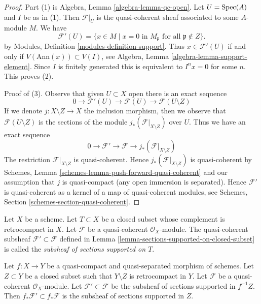 \begin{proof}
Part (1) is Algebra, Lemma \ref{algebra-lemma-qc-open}.
Let $U = \mathop{\mathrm{Spec}}(A)$ and $I$ be as in (1).
Then $\mathcal{F}|_U$ is the quasi-coherent sheaf associated to
some $A$-module $M$. We have
$$
\mathcal{F}'(U) = \{x \in M \mid x = 0\text{ in }M_\mathfrak p
\text{ for all }\mathfrak p \not \in Z\}.
$$
by Modules, Definition \ref{modules-definition-support}. Thus
$x \in \mathcal{F}'(U)$ if and only if $V(\text{Ann}(x)) \subset V(I)$, see
Algebra, Lemma \ref{algebra-lemma-support-element}. Since $I$ is
finitely generated this is equivalent to $I^n x = 0$ for some $n$.
This proves (2).

\medskip\noindent
Proof of (3). Observe that given $U \subset X$ open there is an exact sequence
$$
0 \to \mathcal{F}'(U) \to \mathcal{F}(U) \to \mathcal{F}(U \setminus Z)
$$
If we denote $j : X \setminus Z \to X$ the inclusion morphism, then
we observe that $\mathcal{F}(U \setminus Z)$ is the sections of the
module $j_*(\mathcal{F}|_{X \setminus Z})$ over $U$. Thus we have
an exact sequence
$$
0 \to \mathcal{F}' \to \mathcal{F} \to j_*(\mathcal{F}|_{X \setminus Z})
$$
The restriction $\mathcal{F}|_{X \setminus Z}$ is quasi-coherent.
Hence $j_*(\mathcal{F}|_{X \setminus Z})$ is quasi-coherent
by Schemes, Lemma \ref{schemes-lemma-push-forward-quasi-coherent}
and our assumption that $j$ is quasi-compact (any open immersion
is separated). Hence $\mathcal{F}'$ is quasi-coherent
as a kernel of a map of quasi-coherent modules, see
Schemes, Section \ref{schemes-section-quasi-coherent}.
\end{proof}

\begin{definition}
\label{definition-subsheaf-sections-supported-on-closed}
Let $X$ be a scheme.
Let $T \subset X$ be a closed subset whose complement
is retrocompact in $X$.
Let $\mathcal{F}$ be a quasi-coherent $\mathcal{O}_X$-module.
The quasi-coherent subsheaf $\mathcal{F}' \subset \mathcal{F}$ defined in
Lemma \ref{lemma-sections-supported-on-closed-subset} is called
the {\it subsheaf of sections supported on $T$}.
\end{definition}

\begin{lemma}
\label{lemma-push-sections-supported-on-closed-subset}
Let $f : X \to Y$ be a quasi-compact and quasi-separated morphism
of schemes. Let $Z \subset Y$ be a closed subset such that
$Y \setminus Z$ is retrocompact in $Y$. Let $\mathcal{F}$ be a quasi-coherent
$\mathcal{O}_X$-module. Let $\mathcal{F}' \subset \mathcal{F}$
be the subsheaf of sections supported in $f^{-1}Z$.
Then $f_*\mathcal{F}' \subset f_*\mathcal{F}$ is the subsheaf
of sections supported in $Z$.
\end{lemma}

